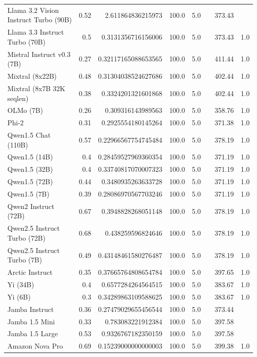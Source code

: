 \begin{table}[htp]
{\begin{tabular}{lrrrrrrr}
Llama 3.2 Vision Instruct Turbo (90B) & 0.52 & 2.611864836215973 & 100.0 & 5.0 &  & 373.43 &  \\
Llama 3.3 Instruct Turbo (70B) & 0.5 & 0.3131356716156006 & 100.0 & 5.0 &  & 373.43 & 1.0 \\
Mistral Instruct v0.3 (7B) & 0.27 & 0.32117165088653565 & 100.0 & 5.0 &  & 411.44 & 1.0 \\
Mixtral (8x22B) & 0.48 & 0.31304038524627686 & 100.0 & 5.0 &  & 402.44 & 1.0 \\
Mixtral (8x7B 32K seqlen) & 0.38 & 0.3324201321601868 & 100.0 & 5.0 &  & 402.44 & 1.0 \\
OLMo (7B) & 0.26 & 0.309316143989563 & 100.0 & 5.0 &  & 358.76 & 1.0 \\
Phi-2 & 0.31 & 0.2925554180145264 & 100.0 & 5.0 &  & 371.38 & 1.0 \\
Qwen1.5 Chat (110B) & 0.57 & 0.22966567754745484 & 100.0 & 5.0 &  & 378.19 & 1.0 \\
Qwen1.5 (14B) & 0.4 & 0.28459527969360354 & 100.0 & 5.0 &  & 371.19 & 1.0 \\
Qwen1.5 (32B) & 0.4 & 0.33740817070007323 & 100.0 & 5.0 &  & 371.19 & 1.0 \\
Qwen1.5 (72B) & 0.44 & 0.3480935263633728 & 100.0 & 5.0 &  & 371.19 & 1.0 \\
Qwen1.5 (7B) & 0.39 & 0.28086970567703246 & 100.0 & 5.0 &  & 371.19 & 1.0 \\
Qwen2 Instruct (72B) & 0.67 & 0.3948828268051148 & 100.0 & 5.0 &  & 378.19 & 1.0 \\
Qwen2.5 Instruct Turbo (72B) & 0.68 & 0.438259596824646 & 100.0 & 5.0 &  & 378.19 & 1.0 \\
Qwen2.5 Instruct Turbo (7B) & 0.49 & 0.43148461580276487 & 100.0 & 5.0 &  & 378.19 & 1.0 \\
Arctic Instruct & 0.35 & 0.37665764808654784 & 100.0 & 5.0 &  & 397.65 & 1.0 \\
Yi (34B) & 0.4 & 0.6577284264564515 & 100.0 & 5.0 &  & 383.67 & 1.0 \\
Yi (6B) & 0.3 & 0.34289863109588625 & 100.0 & 5.0 &  & 383.67 & 1.0 \\
Jamba Instruct & 0.36 & 0.27479029655456544 & 100.0 & 5.0 &  & 373.44 &  \\
Jamba 1.5 Mini & 0.33 & 0.783083221912384 & 100.0 & 5.0 &  & 397.58 &  \\
Jamba 1.5 Large & 0.53 & 0.9326767182350159 & 100.0 & 5.0 &  & 397.58 &  \\
Amazon Nova Pro & 0.69 & 0.15239000000000003 & 100.0 & 5.0 &  & 399.38 & 1.0 \\

\end{tabular}}
\end{table}
